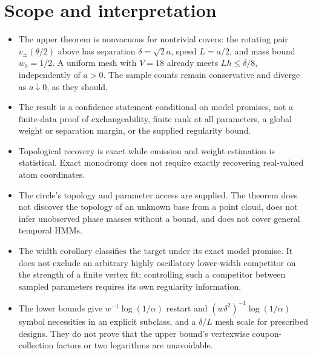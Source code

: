\documentclass[11pt]{article}
\theoremstyle{remark}\newtheorem{remark}[theorem]{Remark}
\begin{document}
\section{Scope and interpretation}
\begin{itemize}
\item The upper theorem is nonvacuous for nontrivial covers: the rotating pair $v_\pm(\theta/2)$ above has separation $\delta=\sqrt2a$, speed $L=a/2$, and mass bound $w_0=1/2$. A uniform mesh with $V=18$ already meets $Lh\leq\delta/8$, independently of $a>0$. The sample counts remain conservative and diverge as $a\downarrow0$, as they should.
\item The result is a confidence statement conditional on model promises, not a finite-data proof of exchangeability, finite rank at all parameters, a global weight or separation margin, or the supplied regularity bound.
\item Topological recovery is exact while emission and weight estimation is statistical. Exact monodromy does not require exactly recovering real-valued atom coordinates.
\item The circle's topology and parameter access are supplied. The theorem does not discover the topology of an unknown base from a point cloud, does not infer unobserved phase masses without a bound, and does not cover general temporal HMMs.
\item The width corollary classifies the target under its exact model promise. It does not exclude an arbitrary highly oscillatory lower-width competitor on the strength of a finite vertex fit; controlling such a competitor between sampled parameters requires its own regularity information.
\item The lower bounds give $w^{-1}\log(1/\alpha)$ restart and $(w\delta^2)^{-1}\log(1/\alpha)$ symbol necessities in an explicit subclass, and a $\delta/L$ mesh scale for prescribed designs. They do not prove that the upper bound's vertexwise coupon-collection factors or two logarithms are unavoidable.
\end{itemize}
\end{document}
